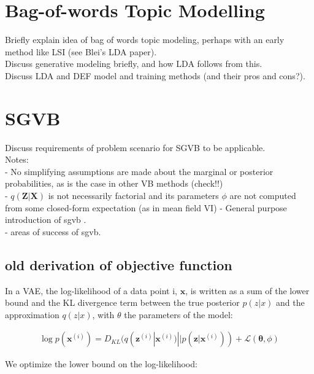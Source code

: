 \documentclass{report}
\begin{document}
\section{Bag-of-words Topic Modelling}




Briefly explain idea of bag of words topic modeling, perhaps with an early method like LSI (see Blei's LDA paper).\\
Discuss generative modeling briefly, and how LDA follows from this. \\
Discuss LDA and DEF model and training methods (and their pros and cons?).



\section{SGVB}\label{sgvb_section}

Discuss requirements of problem scenario for SGVB to be applicable. \\


Notes:\\
- No simplifying assumptions are made about the marginal or posterior probabilities, as is the case in other VB methods (check!!) \\
- $q(\mathbf{Z}|\mathbf{X})$ is not necessarily factorial and its parameters $\phi$ are not computed from some closed-form expectation (as in mean field VI)
- General purpose introduction of sgvb . \\

- areas of success of sgvb.


\subsection{old derivation of objective function}

In a VAE, the log-likelihood of a data point i, $\mathbf{x}$, is written as a sum of the lower bound and the KL divergence term between the true posterior $p(z|x)$ and the approximation $q(z|x)$, with $\theta$ the parameters of the model:

\begin{align*}
\log p(\mathbf{x}^{(i)}) = D_{KL}(q(\mathbf{z}^{(i)}|\mathbf{x}^{(i)}) || p(\mathbf{z}|\mathbf{x}^{(i)})) + \mathcal{L}(\mathbf{\theta}, \phi)
\end{align*}

We optimize the lower bound on the log-likelihood: 

\begin{align}
\end{align}
\end{document}
